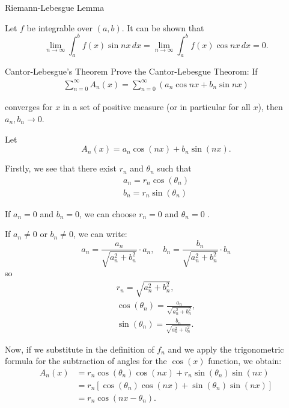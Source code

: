 \documentclass[UTF8,a4paper,10pt]{article}
\begin{document}
\begin{mybox}{Riemann-Lebesgue Lemma}

  Let \(f\) be integrable over \((a,b)\). It can be shown that
  \[\lim_{n\to\infty}\int_{a}^{b}f(x)\sin nx \, dx = \lim_{n\to\infty}\int_{a}^{b}f(x)\cos nx \, dx = 0.\]
\end{mybox}

\pagebreak

\begin{Problem}[]{Cantor-Lebesgue's Theorem}
  Prove the Cantor-Lebesgue Theorom: If
  \begin{align*}
    \sum_{n=0}^{\infty}A_n(x) = \sum_{n=0}^{\infty}(a_n \cos nx +b_n \sin nx)
  \end{align*}

  converges for \(x\) in a set of positive measure (or in particular for all \(x\)), then \(a_n, b_n\to 0\).
\end{Problem}


Let $$A_n(x) = a_n \cos(nx) + b_n \sin(nx).$$

Firstly, we see that there exist $r_n$ and $\theta_n$ such that 
\begin{align*}
  a_n = r_n \cos(\theta_n)\\
  b_n = r_n \sin(\theta_n)
\end{align*}


If $a_n = 0$ and $b_n = 0$, we can choose $r_n = 0$ and $\theta_n = 0$ .

If $a_n \neq 0$ or $b_n \neq 0$, we can write:
\[ a_n = \frac{a_n}{\sqrt{a_n^2 + b_n^2}} \cdot a_n, \quad b_n = \frac{b_n}{\sqrt{a_n^2 + b_n^2}} \cdot b_n \]
so 
\begin{align*}
  r_n = \sqrt{a_n^2 + b_n^2},\\
  \cos(\theta_n) = \frac{a_n}{\sqrt{a_n^2 + b_n^2}},\\
  \sin(\theta_n) = \frac{b_n}{\sqrt{a_n^2 + b_n^2}}.
\end{align*}



Now, if we substitute in the definition of $f_n$ and we apply the trigonometric formula for the subtraction of angles for the $\cos(x)$ function, we obtain:
\begin{align*}
  A_n(x) &= r_n \cos(\theta_n) \cos(nx) + r_n \sin(\theta_n) \sin(nx)\\
  &= r_n [\cos(\theta_n) \cos(nx) + \sin(\theta_n) \sin(nx)]\\
  &= r_n \cos(nx - \theta_n).
\end{align*}
\end{document}
